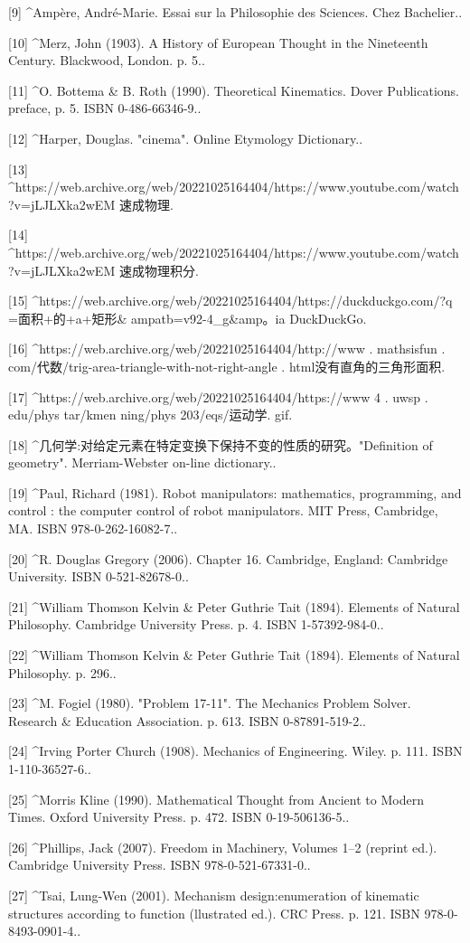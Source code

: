 [9]
^Ampère, André-Marie. Essai sur la Philosophie des Sciences. Chez Bachelier..

[10]
^Merz, John (1903). A History of European Thought in the Nineteenth Century. Blackwood, London. p. 5..

[11]
^O. Bottema & B. Roth (1990). Theoretical Kinematics. Dover Publications. preface, p. 5. ISBN 0-486-66346-9..

[12]
^Harper, Douglas. "cinema". Online Etymology Dictionary..

[13]
^https://web.archive.org/web/20221025164404/https://www.youtube.com/watch?v=jLJLXka2wEM 速成物理.

[14]
^https://web.archive.org/web/20221025164404/https://www.youtube.com/watch?v=jLJLXka2wEM 速成物理积分.

[15]
^https://web.archive.org/web/20221025164404/https://duckduckgo.com/?q =面积+的+a+矩形& ampatb=v92-4_g&amp。ia DuckDuckGo.

[16]
^https://web.archive.org/web/20221025164404/http://www . mathsisfun . com/代数/trig-area-triangle-with-not-right-angle . html没有直角的三角形面积.

[17]
^https://web.archive.org/web/20221025164404/https://www 4 . uwsp . edu/phys tar/kmen ning/phys 203/eqs/运动学. gif.

[18]
^几何学:对给定元素在特定变换下保持不变的性质的研究。"Definition of geometry". Merriam-Webster on-line dictionary..

[19]
^Paul, Richard (1981). Robot manipulators: mathematics, programming, and control : the computer control of robot manipulators. MIT Press, Cambridge, MA. ISBN 978-0-262-16082-7..

[20]
^R. Douglas Gregory (2006). Chapter 16. Cambridge, England: Cambridge University. ISBN 0-521-82678-0..

[21]
^William Thomson Kelvin & Peter Guthrie Tait (1894). Elements of Natural Philosophy. Cambridge University Press. p. 4. ISBN 1-57392-984-0..

[22]
^William Thomson Kelvin & Peter Guthrie Tait (1894). Elements of Natural Philosophy. p. 296..

[23]
^M. Fogiel (1980). "Problem 17-11". The Mechanics Problem Solver. Research & Education Association. p. 613. ISBN 0-87891-519-2..

[24]
^Irving Porter Church (1908). Mechanics of Engineering. Wiley. p. 111. ISBN 1-110-36527-6..

[25]
^Morris Kline (1990). Mathematical Thought from Ancient to Modern Times. Oxford University Press. p. 472. ISBN 0-19-506136-5..

[26]
^Phillips, Jack (2007). Freedom in Machinery, Volumes 1–2 (reprint ed.). Cambridge University Press. ISBN 978-0-521-67331-0..

[27]
^Tsai, Lung-Wen (2001). Mechanism design:enumeration of kinematic structures according to function (llustrated ed.). CRC Press. p. 121. ISBN 978-0-8493-0901-4..
